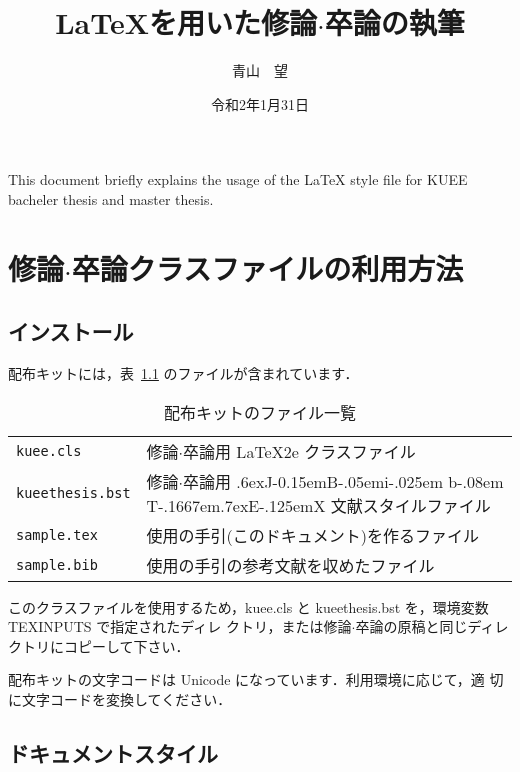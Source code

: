 \documentclass{kuee}
\title{\LaTeX を用いた修論$\cdot$卒論の執筆}
\author{青山　望}
\date{令和2年1月31日}
\def\BibTeX{{\rm B\kern-.05em{\sc i\kern-.025em b}\kern-.08em
    T\kern-.1667em\lower.7ex\hbox{E}\kern-.125emX}}
\def\JBibTeX{\leavevmode\lower .6ex\hbox{J}\kern-0.15em\BibTeX}
\begin{document}
\maketitle			%
\begin{eabstract}		%
This document briefly explains the usage of the \LaTeX{} style file
for KUEE bacheler thesis and master thesis.
\end{eabstract}
\tableofcontents		%



\chapter{修論$\cdot$卒論クラスファイルの利用方法}
\label{chap:usage}

\section{インストール}

配布キットには，表~\ref{tab:kit} のファイルが含まれています．
\begin{table}
  \caption{配布キットのファイル一覧}\label{tab:kit}
  \begin{center}
    \begin{tabular}{ll}
      \verb+kuee.cls+ & 修論$\cdot$卒論用 \LaTeX2e{} クラスファイル \\
      \verb+kueethesis.bst+ & 修論$\cdot$卒論用 \JBibTeX{} 文献スタイルファイル \\
      \verb+sample.tex+ & 使用の手引(このドキュメント)を作るファイル \\
      \verb+sample.bib+ & 使用の手引の参考文献を収めたファイル \\
    \end{tabular}
  \end{center}
\end{table}

このクラスファイルを使用するため，{\ttfamily kuee.cls} と {\ttfamily
kueethesis.bst} を，環境変数 {\ttfamily TEXINPUTS} で指定されたディレ
クトリ，または修論$\cdot$卒論の原稿と同じディレクトリにコピーして下さい．

配布キットの文字コードは Unicode になっています．利用環境に応じて，適
切に文字コードを変換してください．


\section{ドキュメントスタイル}
\end{document}
